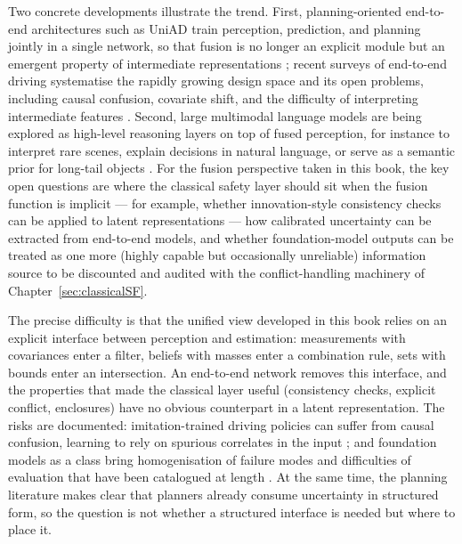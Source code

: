 Two concrete developments illustrate the trend. First, planning-oriented end-to-end architectures such as UniAD train perception, prediction, and planning jointly in a single network, so that fusion is no longer an explicit module but an emergent property of intermediate representations \cite{hu2023_uniad}; recent surveys of end-to-end driving systematise the rapidly growing design space and its open problems, including causal confusion, covariate shift, and the difficulty of interpreting intermediate features \cite{chen2024_e2e_survey}. Second, large multimodal language models are being explored as high-level reasoning layers on top of fused perception, for instance to interpret rare scenes, explain decisions in natural language, or serve as a semantic prior for long-tail objects \cite{cui2024_mllm_driving}. For the fusion perspective taken in this book, the key open questions are where the classical safety layer should sit when the fusion function is implicit --- for example, whether innovation-style consistency checks can be applied to latent representations --- how calibrated uncertainty can be extracted from end-to-end models, and whether foundation-model outputs can be treated as one more (highly capable but occasionally unreliable) information source to be discounted and audited with the conflict-handling machinery of Chapter~\ref{sec:classicalSF}.

The precise difficulty is that the unified view developed in this book relies on an explicit interface between perception and estimation: measurements with covariances enter a filter, beliefs with masses enter a combination rule, sets with bounds enter an intersection. An end-to-end network removes this interface, and the properties that made the classical layer useful (consistency checks, explicit conflict, enclosures) have no obvious counterpart in a latent representation. The risks are documented: imitation-trained driving policies can suffer from causal confusion, learning to rely on spurious correlates in the input \cite{dehaan2019_causal_confusion}; and foundation models as a class bring homogenisation of failure modes and difficulties of evaluation that have been catalogued at length \cite{bommasani2021_foundation}. At the same time, the planning literature \cite{schwarting2018_planning} makes clear that planners already consume uncertainty in structured form, so the question is not whether a structured interface is needed but where to place it.

